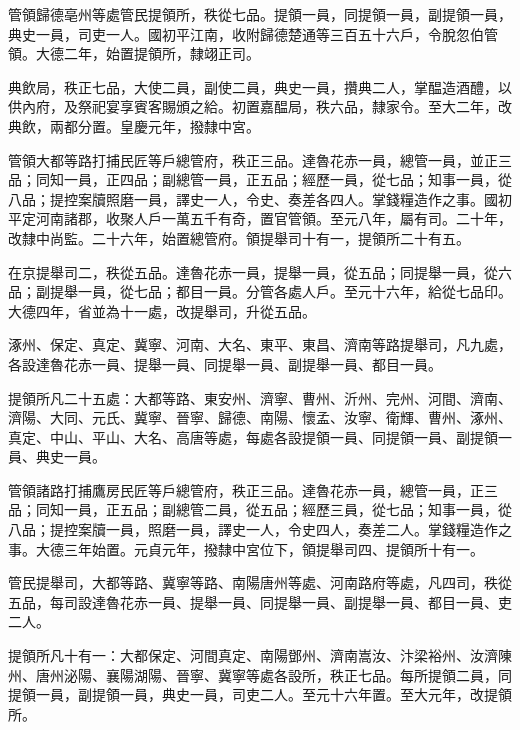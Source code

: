 \begin{pinyinscope}
 管領歸德亳州等處管民提領所，秩從七品。提領一員，同提領一員，副提領一員，典史一員，司吏一人。國初平江南，收附歸德楚通等三百五十六戶，令脫忽伯管領。大德二年，始置提領所，隸翊正司。



 典飲局，秩正七品，大使二員，副使二員，典史一員，攢典二人，掌醖造酒醴，以供內府，及祭祀宴享賓客賜頒之給。初置嘉醖局，秩六品，隸家令。至大二年，改典飲，兩都分置。皇慶元年，撥隸中宮。



 管領大都等路打捕民匠等戶總管府，秩正三品。達魯花赤一員，總管一員，並正三品；同知一員，正四品；副總管一員，正五品；經歷一員，從七品；知事一員，從八品；提控案牘照磨一員，譯史一人，令史、奏差各四人。掌錢糧造作之事。國初平定河南諸郡，收聚人戶一萬五千有奇，置官管領。至元八年，屬有司。二十年，改隸中尚監。二十六年，始置總管府。領提舉司十有一，提領所二十有五。



 在京提舉司二，秩從五品。達魯花赤一員，提舉一員，從五品；同提舉一員，從六品；副提舉一員，從七品；都目一員。分管各處人戶。至元十六年，給從七品印。大德四年，省並為十一處，改提舉司，升從五品。



 涿州、保定、真定、冀寧、河南、大名、東平、東昌、濟南等路提舉司，凡九處，各設達魯花赤一員、提舉一員、同提舉一員、副提舉一員、都目一員。



 提領所凡二十五處：大都等路、東安州、濟寧、曹州、沂州、完州、河間、濟南、濟陽、大同、元氏、冀寧、晉寧、歸德、南陽、懷孟、汝寧、衛輝、曹州、涿州、真定、中山、平山、大名、高唐等處，每處各設提領一員、同提領一員、副提領一員、典史一員。



 管領諸路打捕鷹房民匠等戶總管府，秩正三品。達魯花赤一員，總管一員，正三品；同知一員，正五品；副總管二員，從五品；經歷三員，從七品；知事一員，從八品；提控案牘一員，照磨一員，譯史一人，令史四人，奏差二人。掌錢糧造作之事。大德三年始置。元貞元年，撥隸中宮位下，領提舉司四、提領所十有一。



 管民提舉司，大都等路、冀寧等路、南陽唐州等處、河南路府等處，凡四司，秩從五品，每司設達魯花赤一員、提舉一員、同提舉一員、副提舉一員、都目一員、吏二人。



 提領所凡十有一：大都保定、河間真定、南陽鄧州、濟南嵩汝、汴梁裕州、汝濟陳州、唐州泌陽、襄陽湖陽、晉寧、冀寧等處各設所，秩正七品。每所提領二員，同提領一員，副提領一員，典史一員，司吏二人。至元十六年置。至大元年，改提領所。




\end{pinyinscope}
